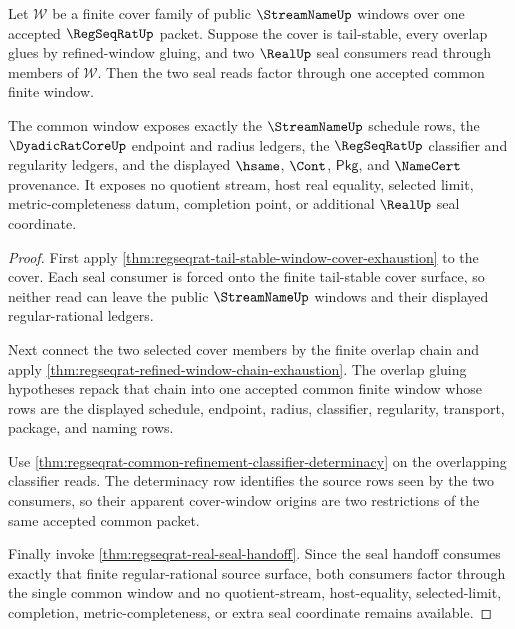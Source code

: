 \begin{theorem}
\label{thm:regseqrat-tail-stable-cover-common-window-lock}
Let $\mathcal W$ be a finite cover family of public $\StreamNameUp$ windows
over one accepted $\RegSeqRatUp$ packet. Suppose the cover is tail-stable,
every overlap glues by refined-window gluing, and two $\RealUp$ seal
consumers read through members of $\mathcal W$. Then the two seal reads factor
through one accepted common finite window.

The common window exposes exactly the $\StreamNameUp$ schedule rows, the
$\DyadicRatCoreUp$ endpoint and radius ledgers, the $\RegSeqRatUp$
classifier and regularity ledgers, and the displayed $\hsame$, $\Cont$,
$\mathsf{Pkg}$, and $\NameCert$ provenance. It exposes no quotient stream,
host real equality, selected limit, metric-completeness datum, completion
point, or additional $\RealUp$ seal coordinate.
\end{theorem}
\begin{proof}
First apply
\autoref{thm:regseqrat-tail-stable-window-cover-exhaustion} to the cover.
Each seal consumer is forced onto the finite tail-stable cover surface, so
neither read can leave the public $\StreamNameUp$ windows and their displayed
regular-rational ledgers.

Next connect the two selected cover members by the finite overlap chain and
apply \autoref{thm:regseqrat-refined-window-chain-exhaustion}. The overlap
gluing hypotheses repack that chain into one accepted common finite window
whose rows are the displayed schedule, endpoint, radius, classifier,
regularity, transport, package, and naming rows.

Use \autoref{thm:regseqrat-common-refinement-classifier-determinacy} on the
overlapping classifier reads. The determinacy row identifies the source rows
seen by the two consumers, so their apparent cover-window origins are two
restrictions of the same accepted common packet.

Finally invoke \autoref{thm:regseqrat-real-seal-handoff}. Since the seal
handoff consumes exactly that finite regular-rational source surface, both
consumers factor through the single common window and no quotient-stream,
host-equality, selected-limit, completion, metric-completeness, or extra seal
coordinate remains available.
\end{proof}

